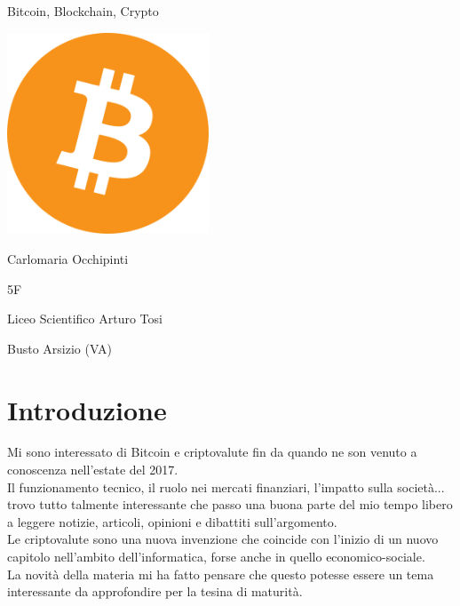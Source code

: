 \documentclass {article}
\begin{document}
\begin{titlepage}

\centering
{\Huge Bitcoin, Blockchain, Crypto\par}
\vfill
\includegraphics [width = 6cm] {logo.png}
\vfill
{\LARGE Carlomaria Occhipinti\par}
\vspace {0.2cm}
{\LARGE 5F\par}
\vspace {1cm}
{\Large Liceo Scientifico Arturo Tosi\par}
\vspace {0.2cm}
{\Large Busto Arsizio (VA)}

\end{titlepage}


\shipout\null



\vspace {1cm}

\section * {\hfil Introduzione \hfil}

\vspace {2cm}

Mi sono interessato di Bitcoin e criptovalute fin da quando ne son venuto a conoscenza nell'estate del 2017.\\

\medskip
\noindent
%
Il funzionamento tecnico, il ruolo nei mercati finanziari, l'impatto sulla società... trovo tutto talmente interessante che passo una buona parte del mio tempo libero a leggere notizie, articoli, opinioni e dibattiti sull'argomento.\\

\medskip
\noindent
%
Le criptovalute sono una nuova invenzione che coincide con l'inizio di un nuovo capitolo nell'ambito dell'informatica, forse anche in quello economico-sociale.\\

\medskip
\noindent
%
La novità della materia mi ha fatto pensare che questo potesse essere un tema interessante da approfondire per la tesina di maturità.\\
\end{document}
